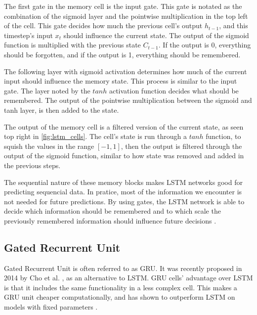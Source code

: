 The first gate in the memory cell is the input gate. This gate is notated as the combination of the sigmoid layer and the pointwise multiplication in the top left of the cell. This gate decides how much the previous cell's output $h_{t-1}$, and this timestep's input $x_t$ should influence the current state. The output of the sigmoid function is multiplied with the previous state $C_{t-1}$. If the output is 0, everything should be forgotten, and if the output is 1, everything should be remembered. 

The following layer with sigmoid activation determines how much of the current input should influence the memory state. This process is similar to the input gate. The layer noted by the $tanh$ activation function decides what should be remembered. The output of the pointwise multiplication between the sigmoid and tanh layer, is then added to the state.

The output of the memory cell is a filtered version of the current state, as seen top right in \ref{fig:lstm_cells}. The cell's state is run through a $tanh$ function, to squish the values in the range $[-1, 1]$, then the output is filtered through the output of the sigmoid function, similar to how state was removed and added in the previous steps. 

The sequential nature of these memory blocks makes LSTM networks good for predicting sequencial data. In pratice, most of the information we encounter is not needed for future predictions. By using gates, the LSTM network is able to decide which information should be remembered and to which scale the previously remembered information should influence future decisions \cite{gers_learning_1999} \cite{_understanding_2015}.

\subsection{Gated Recurrent Unit}

Gated Recurrent Unit is often referred to as GRU. It was recently proposed in 2014 by Cho et al. \cite{cho_learning_2014}, as an alternative to LSTM. GRU cells' advantage over LSTM is that it includes the same functionality in a less complex cell. This makes a GRU unit cheaper computationally, and has shown to outperform LSTM on models with fixed parameters \cite{chung_empirical_2014}. 

